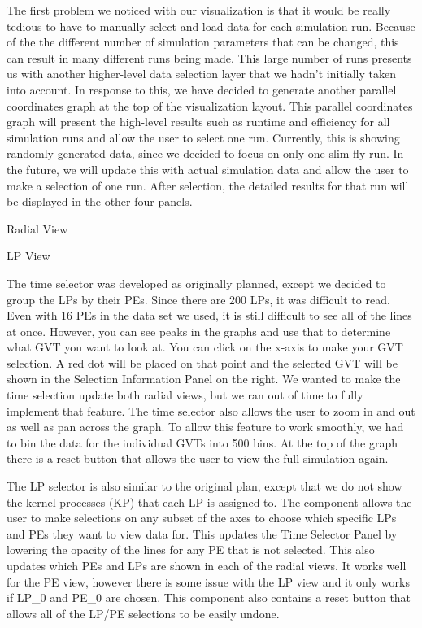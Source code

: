 \documentclass{acm_proc_article-sp}
\begin{document}
The first problem we noticed with our visualization is that it would be really tedious to have to manually select and load data for each simulation run.  Because of the the different number of simulation parameters that can be changed, this can result in many different runs being made.  This large number of runs presents us with another higher-level data selection layer that we hadn't initially taken into account.  In response to this, we have decided to generate another parallel coordinates graph at the top of the visualization layout. This parallel coordinates graph will present the high-level results such as runtime and efficiency for all simulation runs and allow the user to select one run. Currently, this is showing randomly generated data, since we decided to focus on only one slim fly run.  In the future, we will update this with actual simulation data and allow the user to make a selection of one run. After selection, the  detailed results for that run will be displayed in the other four panels.

Radial View

LP View

The time selector was developed as originally planned, except we decided to group the LPs by their PEs.  Since there are 200 LPs, it was difficult to read.  Even with 16 PEs in the data set we used, it is still difficult to see all of the lines at once.  However, you can see peaks in the graphs and use that to determine what GVT you want to look at.  You can click on the x-axis to make your GVT selection.  A red dot will be placed on that point and the selected GVT will be shown in the Selection Information Panel on the right.  We wanted to make the time selection update both radial views, but we ran out of time to fully implement that feature.  The time selector also allows the user to zoom in and out as well as pan across the graph.  To allow this feature to work smoothly, we had to bin the data for the individual GVTs into 500 bins.  At the top of the graph there is a reset button that allows the user to view the full simulation again.

The LP selector is also similar to the original plan, except that we do not show the kernel processes (KP) that each LP is assigned to.  The component allows the user to make selections on any subset of the axes to choose which specific LPs and PEs they want to view data for.  This updates the Time Selector Panel by lowering the opacity of the lines for any PE that is not selected.  This also updates which PEs and LPs are shown in each of the radial views.  It works well for the PE view, however there is some issue with the LP view and it only works if LP\_0 and PE\_0 are chosen.  This component also contains a reset button that allows all of the LP/PE selections to be easily undone.  
\end{document}
